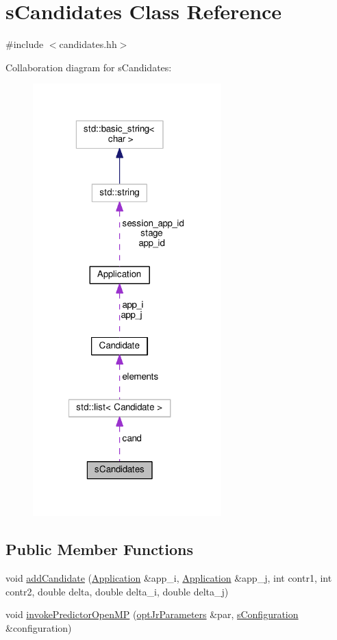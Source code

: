 \hypertarget{classsCandidates}{\section{s\-Candidates Class Reference}
\label{classsCandidates}
}


{\ttfamily \#include $<$candidates.\-hh$>$}



Collaboration diagram for s\-Candidates\-:
\nopagebreak
\begin{figure}[H]
\begin{center}
\leavevmode
\includegraphics[width=206pt]{classsCandidates__coll__graph}
\end{center}
\end{figure}
\subsection*{Public Member Functions}
\begin{DoxyCompactItemize}
\item 
void \hyperlink{classsCandidates_a48323f8fa14cde7569faa219d8282b9d}{add\-Candidate} (\hyperlink{classApplication}{Application} \&app\-\_\-i, \hyperlink{classApplication}{Application} \&app\-\_\-j, int contr1, int contr2, double delta, double delta\-\_\-i, double delta\-\_\-j)
\item 
void \hyperlink{classsCandidates_ac5ff86e5acf736ef57a3eb25c0d724ab}{invoke\-Predictor\-Open\-M\-P} (\hyperlink{classoptJrParameters}{opt\-Jr\-Parameters} \&par, \hyperlink{readConfigurationFile_8hh_ab8f35b1da3261263c5e9c0e7c8921f5c}{s\-Configuration} \&configuration)
\end{DoxyCompactItemize}
